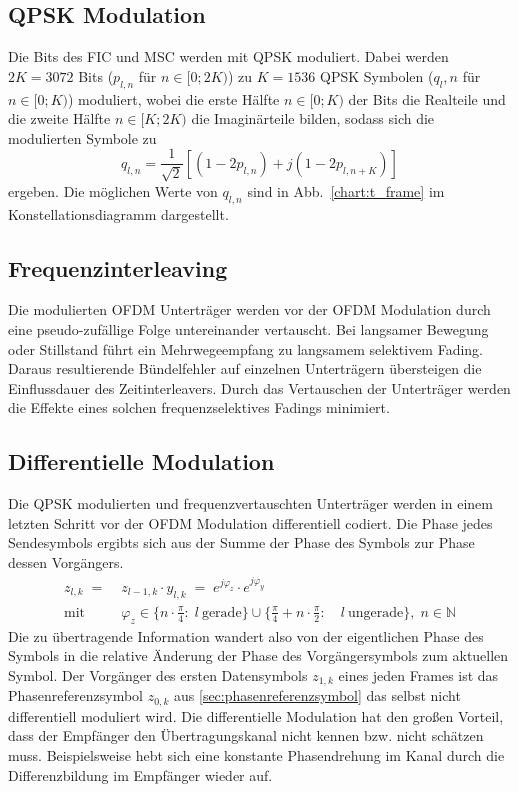\subsection{QPSK Modulation}
\label{sec:qpsk}
Die Bits des FIC und MSC werden mit QPSK moduliert. Dabei werden $2K=3072$ Bits ($p_{l,n}$ für $n\in[0;2K)$) zu $K=1536$ QPSK Symbolen ($q_l,n$ für $n\in[0;K)$) moduliert, wobei die erste Hälfte $n\in [0;K)$ der Bits die Realteile und die zweite Hälfte $n\in [K;2K)$ die Imaginärteile bilden, sodass sich die modulierten Symbole zu
\begin{equation}
q_{l,n} = \frac{1}{\sqrt{2}}\left[\left(1-2p_{l,n}\right)+j\left(1-2p_{l,n+K}\right)\right]
\end{equation}
ergeben. Die möglichen Werte von $q_{l,n}$ sind in Abb.~\ref{chart:t_frame} im Konstellationsdiagramm dargestellt.

\subsection{Frequenzinterleaving}
Die modulierten OFDM Unterträger werden vor der OFDM Modulation durch eine pseudo-zufällige Folge untereinander vertauscht. Bei langsamer Bewegung oder Stillstand führt ein Mehrwegeempfang zu langsamem selektivem Fading. Daraus resultierende Bündelfehler auf einzelnen Unterträgern übersteigen die Einflussdauer des Zeitinterleavers. Durch das Vertauschen der Unterträger werden die Effekte eines solchen frequenzselektives Fadings minimiert. 


\subsection{Differentielle Modulation}
\label{sec:diff_mod}
Die QPSK modulierten und frequenzvertauschten Unterträger werden in einem letzten Schritt vor der OFDM Modulation differentiell codiert. Die Phase jedes Sendesymbols ergibts sich aus der Summe der Phase des Symbols zur Phase dessen Vorgängers.
\begin{equation}
\begin{aligned}
z_{l,k}\; =\; &z_{l-1,k}\cdot y_{l,k}\; =\; e^{j\varphi_z} \cdot e^{j\varphi_y} \\
\text{mit} \; \; &\varphi_z \in \{n \cdot \frac{\pi}{4}: \; l \: \text{gerade}\} \cup \{\frac{\pi}{4} + n \cdot \frac{\pi}{2}: \quad l \: \text{ungerade}\}, \; n\in \mathbb{N} 
\end{aligned}
\end{equation}
Die zu übertragende Information wandert also von der eigentlichen Phase des Symbols in die relative Änderung der Phase des Vorgängersymbols zum aktuellen Symbol. Der Vorgänger des ersten Datensymbols $z_{1,k}$ eines jeden Frames ist das Phasenreferenzsymbol $z_{0,k}$ aus \ref{sec:phasenreferenzsymbol} das selbst nicht differentiell moduliert wird. Die differentielle Modulation hat den großen Vorteil, dass der Empfänger den Übertragungskanal nicht kennen bzw. nicht schätzen muss. Beispielsweise hebt sich eine konstante Phasendrehung im Kanal durch die Differenzbildung im Empfänger wieder auf.


